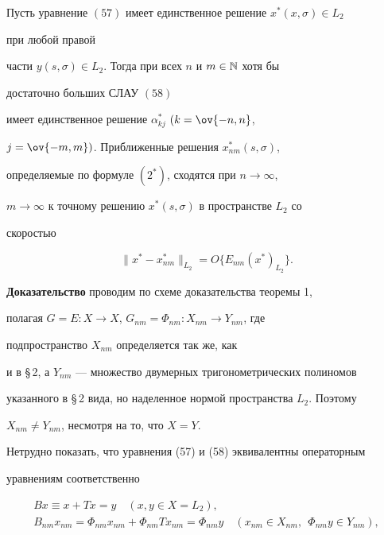  


\begin{thm} 


Пусть уравнение $(57)$ имеет единственное решение $x^*(x,\sigma)\in L_2$ 


при любой правой 


части $y(s,\sigma)\in L_2$. Тогда при всех $n$ и $m\in\Bbb N$ хотя бы 


достаточно больших СЛАУ $(58)$ 


имеет единственное решение $\alpha^*_{kj}$ $(k=\ov{-n,n}$, 


$j=\ov{-m,m})$. Приближенные решения $x^*_{nm}(s,\sigma)$, 


определяемые по формуле $(2^\ast)$, сходятся при $n\to\infty$, 


$m\to\infty$ к точному решению $x^*(s,\sigma)$ в пространстве $L_2$ со 


скоростью 


\begin{equation} 


\|x^*-x^*_{nm}\|_{L_2}=O\{E_{nm}(x^*)_{L_2}\}. 


\end{equation} 


\end{thm} 


 


{\bf Доказательство} проводим по схеме доказательства теоремы 1, 


полагая $G=E:X\to X$, $G_{nm}=\Phi_{nm}:X_{nm}\to Y_{nm}$, где 


подпространство $X_{nm}$ определяется так же, как 


и в \S\,2, а $Y_{nm}$ --- множество двумерных тригонометрических полиномов 


указанного в \S\,2 вида, но наделенное нормой пространства $L_2$. Поэтому 


$X_{nm}\ne Y_{nm}$, несмотря на то, что $X=Y$. 


 


Нетрудно показать, что уравнения (57) и (58) эквивалентны операторным 


уравнениям соответственно 


\begin{gather} 


B x\equiv x+T x=y\quad (x,y\in X=L_2), \\ 


% 


B_{nm}x_{nm}=\Phi_{nm}x_{nm}+\Phi_{nm}T x_{nm}= 


\Phi_{nm}y\quad (x_{nm}\in X_{nm},\ \ \Phi_{nm}y\in Y_{nm}), 


\end{gather} 


